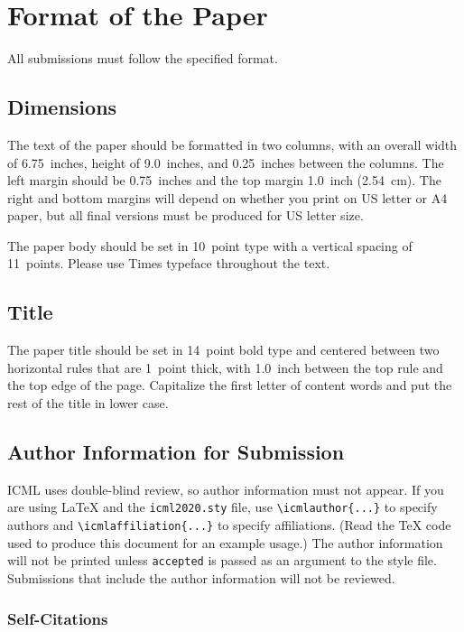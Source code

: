 \documentclass{article}
\begin{document}
\section{Format of the Paper}

All submissions must follow the specified format.

\subsection{Dimensions}




The text of the paper should be formatted in two columns, with an
overall width of 6.75~inches, height of 9.0~inches, and 0.25~inches
between the columns. The left margin should be 0.75~inches and the top
margin 1.0~inch (2.54~cm). The right and bottom margins will depend on
whether you print on US letter or A4 paper, but all final versions
must be produced for US letter size.

The paper body should be set in 10~point type with a vertical spacing
of 11~points. Please use Times typeface throughout the text.

\subsection{Title}

The paper title should be set in 14~point bold type and centered
between two horizontal rules that are 1~point thick, with 1.0~inch
between the top rule and the top edge of the page. Capitalize the
first letter of content words and put the rest of the title in lower
case.

\subsection{Author Information for Submission}
\label{author info}

ICML uses double-blind review, so author information must not appear. If
you are using \LaTeX\/ and the \texttt{icml2020.sty} file, use
\verb+\icmlauthor{...}+ to specify authors and \verb+\icmlaffiliation{...}+ to specify affiliations. (Read the TeX code used to produce this document for an example usage.) The author information
will not be printed unless \texttt{accepted} is passed as an argument to the
style file.
Submissions that include the author information will not
be reviewed.

\subsubsection{Self-Citations}
\end{document}
